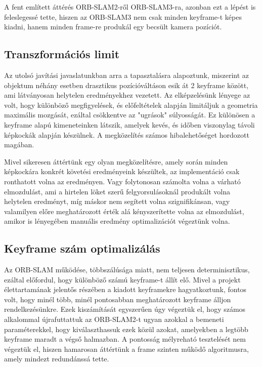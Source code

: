 A fent említett áttérés ORB-SLAM2-ről ORB-SLAM3-ra, azonban ezt a lépést is feleslegessé tette, hiszen az ORB-SLAM3 nem csak minden keyframe-t képes kiadni, hanem minden frame-re produkál egy becsült kamera pozíciót.

\subsection{Transzformációs limit}

Az utolsó javítási javaslatunkban arra a tapasztalásra alapoztunk, miszerint az objektum néhány esetben drasztikus pozícióváltáson esik át 2 keyframe között, ami látványosan helytelen eredményekhez vezetett.
Az elképzelésünk lényege az volt, hogy különböző megfigyelések, és előfeltételek alapján limitáljuk a geometria maximális mozgását, ezáltal csökkentve az "ugrások" súlyosságát.
Ez különösen a keyframe alapú kimeneteinken látszik, amelyek kevés, és időben viszonylag távoli képkockák alapján készülnek.
A megközelítés számos hibalehetőséget hordozott magában.

Mivel sikeresen áttértünk egy olyan megközelítésre, amely során minden képkockára konkrét követési eredményeink készültek, az implementáció csak ronthatott volna az eredményen.
Vagy folytonosan számolta volna a várható elmozdulást, ami a hirtelen löket szerű felgyorsulásoknál produkált volna helytelen eredményt, míg máskor nem segített volna szignifikánsan, vagy valamilyen előre meghatározott érték alá kényszerítette volna az elmozdulást, amikor is lényegében manuális eredmény optimalizációt végeztünk volna.

\subsection{Keyframe szám optimalizálás}

Az ORB-SLAM működése, többszálúsága miatt, nem teljesen determinisztikus, ezáltal előfordul, hogy különböző számú keyframe-t állít elő.
Mivel a projekt élettartamának jelentős részében a kiadott keyframekre hagyatkoztunk, fontos volt, hogy minél több, minél pontosabban meghatározott keyframe álljon rendelkezésünkre.
Ezek kiszámítását egyszerűen úgy végeztük el, hogy számos alkalommal újrafuttattuk az ORB-SLAM2-t ugyan azokkal a bemeneti paraméterekkel, hogy kiválaszthassuk ezek közül azokat, amelyekben a legtöbb keyframe maradt a végső halmazban.
A pontosság mélyreható tesztelését nem végeztük el, hiszen hamarosan áttértünk a frame szinten működő algoritmusra, amely mindezt redundánssá tette.

